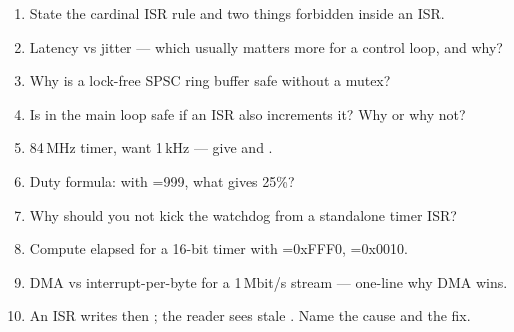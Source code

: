 \begin{scorecard}
\begin{enumerate}
\item State the cardinal ISR rule and two things forbidden inside an ISR.
\item Latency vs jitter --- which usually matters more for a control loop, and
  why?
\item Why is a lock-free SPSC ring buffer safe without a mutex?
\item Is  in the main loop safe if an ISR also increments it?
  Why or why not?
\item 84\,MHz timer, want 1\,kHz --- give  and .
\item Duty formula: with =999, what  gives 25\%?
\item Why should you not kick the watchdog from a standalone timer ISR?
\item Compute elapsed for a 16-bit timer with =0xFFF0,
  =0x0010.
\item DMA vs interrupt-per-byte for a 1\,Mbit/s stream --- one-line why DMA
  wins.
\item An ISR writes  then ; the reader sees stale
  . Name the cause and the fix.
\end{enumerate}
\end{scorecard}

